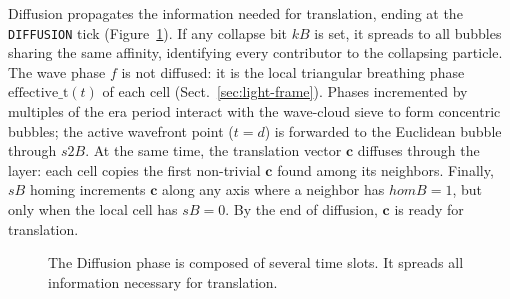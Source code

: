 \documentclass[a4paper]{article}
\begin{document}
Diffusion propagates the information needed for translation, ending at the \texttt{DIFFUSION} tick (Figure~\ref{fig:diffusion}). If any collapse bit $kB$ is set, it spreads to all bubbles sharing the same affinity, identifying every contributor to the collapsing particle.
The wave phase $f$ is not diffused: it is the local triangular breathing phase $\mathrm{effective\_t}(t)$ of each cell (Sect.~\ref{sec:light-frame}). Phases incremented by multiples of the era period interact with the wave-cloud sieve to form concentric bubbles; the active wavefront point ($t=d$) is forwarded to the Euclidean bubble through $s2B$.
At the same time, the translation vector $\mathbf{c}$ diffuses through the layer: each cell copies the first non-trivial $\mathbf{c}$ found among its neighbors. Finally, $sB$ homing increments $\boldsymbol{c}$ along any axis where a neighbor has $homB=1$, but only when the local cell has $sB=0$. By the end of diffusion, $\boldsymbol{c}$ is ready for translation.
\begin{figure}
\begin{center}
\end{center}
\caption{The Diffusion phase is composed of several time slots. It spreads all information necessary for translation.}
\label{fig:diffusion}
\end{figure}
\end{document}
